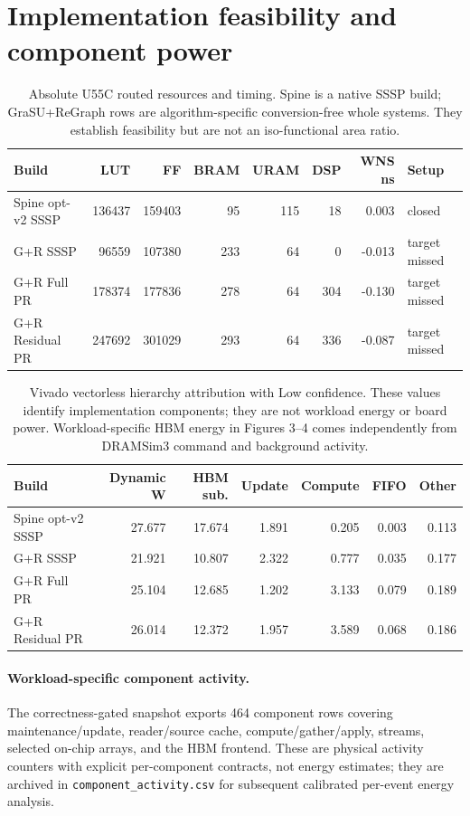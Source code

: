 \documentclass[10pt]{article}
\begin{document}
\section{Implementation feasibility and component power}
\begin{table}[ht]
\centering
\small
\begin{tabular}{lrrrrrrl}
\toprule
Build & LUT & FF & BRAM & URAM & DSP & WNS ns & Setup \\
\midrule
    Spine opt-v2 SSSP & 136437 & 159403 & 95 & 115 & 18 & 0.003 & closed \\
    G+R SSSP & 96559 & 107380 & 233 & 64 & 0 & -0.013 & target missed \\
    G+R Full PR & 178374 & 177836 & 278 & 64 & 304 & -0.130 & target missed \\
    G+R Residual PR & 247692 & 301029 & 293 & 64 & 336 & -0.087 & target missed \\
\bottomrule
\end{tabular}
\caption{Absolute U55C routed resources and timing. Spine is a native SSSP
build; GraSU+ReGraph rows are algorithm-specific conversion-free whole systems.
They establish feasibility but are not an iso-functional area ratio.}
\end{table}

\begin{table}[ht]
\centering
\small
\begin{tabular}{lrrrrrr}
\toprule
Build & Dynamic W & HBM sub. & Update & Compute & FIFO & Other \\
\midrule
    Spine opt-v2 SSSP & 27.677 & 17.674 & 1.891 & 0.205 & 0.003 & 0.113 \\
    G+R SSSP & 21.921 & 10.807 & 2.322 & 0.777 & 0.035 & 0.177 \\
    G+R Full PR & 25.104 & 12.685 & 1.202 & 3.133 & 0.079 & 0.189 \\
    G+R Residual PR & 26.014 & 12.372 & 1.957 & 3.589 & 0.068 & 0.186 \\
\bottomrule
\end{tabular}
\caption{Vivado vectorless hierarchy attribution with Low confidence. These
values identify implementation components; they are not workload energy or
board power. Workload-specific HBM energy in Figures 3--4 comes independently
from DRAMSim3 command and background activity.}
\end{table}

\paragraph{Workload-specific component activity.}
The correctness-gated snapshot exports 464 component
rows covering maintenance/update, reader/source cache, compute/gather/apply,
streams, selected on-chip arrays, and the HBM frontend. These are physical
activity counters with explicit per-component contracts, not energy estimates;
they are archived in \texttt{component\_activity.csv} for subsequent calibrated
per-event energy analysis.
\clearpage
\end{document}
